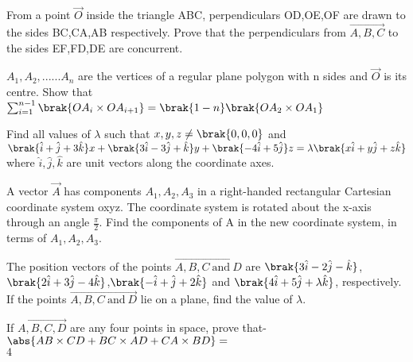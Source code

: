 
\iffalse
  \title{20. Vector Algebra}
  \author{Niketh Prakash Achanta - EE24BTECH11047}
  \section{subjective}
\fi

\item From a point $\vec{O}$ inside the triangle ABC, perpendiculars OD,OE,OF are drawn to the sides BC,CA,AB respectively. Prove that the perpendiculars from $\vec{A,B,C}$ to the sides EF,FD,DE are concurrent. \hfill{}\\

	\item $A_1,A_2,......A_n$ are the vertices of a regular plane polygon with n sides and $\vec{O}$ is its centre. Show that
	$\sum_{i=1}^{n-1}\brak{OA_i\times OA_{i+1}}= \brak{1-n}\brak{OA_2\times OA_1}$
		\hfill{}\\

	\item Find all values of $\lambda$ such that $x,y,z\neq\brak{0,0,0}$ and $\brak{\hat{i}+\hat{j}+3\hat{k}}x+\brak{3\hat{i}-3\hat{j}+\hat{k}}y+\brak{-4\hat{i}+5\hat{j}}z=\lambda\brak{x\hat{i}+y\hat{j}+z\hat{k}}$ where $\hat{i},\hat{j},\hat{k}$ are unit vectors along the coordinate axes. \hfill{}\\

	\item A vector $\vec{A}$ has components $A_1,A_2,A_3$ in a right-handed rectangular Cartesian coordinate system oxyz. The coordinate system is rotated about the x-axis through an angle $\frac{\pi}{2}$. Find the components of A in the new coordinate system, in terms of $A_1,A_2,A_3$. \hfill{}\\

	\item The position vectors of the points $\vec{A,B,C\ \text{and}\ D}$ are $\brak{3\hat{i}-2\hat{j}-\hat{k}}$,$\brak{2\hat{i}+3\hat{j}-4\hat{k}}$,$\brak{-\hat{i}+\hat{j}+2\hat{k}}$ and $\brak{4\hat{i}+5\hat{j}+\lambda\hat{k}}$, respectively. If the points $\vec{A,B,C\ \text{and}\ D}$ lie on a plane, find the value of $\lambda$. \hfill{}\\

	\item If $\vec{A,B,C,D}$ are any four points in space, prove that-
		$\abs{AB\times CD+ BC\times AD+CA\times BD}=$\\ $4$  \hfill{}\\



